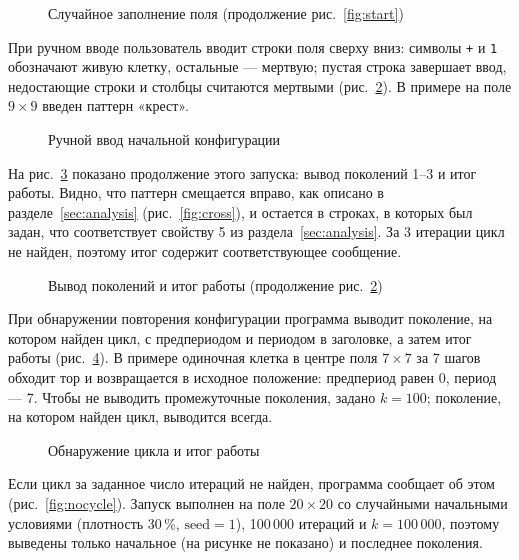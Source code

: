\documentclass[a4paper,14pt]{extarticle}
\newcommand{\consolemedium}{\fontsize{9}{10.5}\selectfont\ttfamily}
\newcommand{\consolesmall}{\fontsize{7}{7.35}\selectfont\ttfamily}
\newcommand{\console}[2][\consolesmall]{}
\begin{document}
\begin{figure}[H]
	\centering
	\console[\consolemedium]{randinit}
	\caption{Случайное заполнение поля (продолжение рис.~\ref{fig:start})}
	\label{fig:randinit}
\end{figure}

При ручном вводе пользователь вводит строки поля сверху вниз: символы \texttt{+} и \texttt{1} обозначают живую клетку, остальные --- мертвую; пустая строка завершает ввод, недостающие строки и столбцы считаются мертвыми (рис.~\ref{fig:manual}). В примере на поле $9 \times 9$ введен паттерн «крест».

\begin{figure}[H]
	\centering
	\console[\consolemedium]{manual}
	\caption{Ручной ввод начальной конфигурации}
	\label{fig:manual}
\end{figure}

На рис.~\ref{fig:run} показано продолжение этого запуска: вывод поколений 1--3 и итог работы. Видно, что паттерн смещается вправо, как описано в разделе~\ref{sec:analysis} (рис.~\ref{fig:cross}), и остается в строках, в которых был задан, что соответствует свойству 5 из раздела~\ref{sec:analysis}. За 3 итерации цикл не найден, поэтому итог содержит соответствующее сообщение.

\begin{figure}[H]
	\centering
	\console[\consolemedium]{run}
	\caption{Вывод поколений и итог работы (продолжение рис.~\ref{fig:manual})}
	\label{fig:run}
\end{figure}

При обнаружении повторения конфигурации программа выводит поколение, на котором найден цикл, с предпериодом и периодом в заголовке, а затем итог работы (рис.~\ref{fig:cycle}). В примере одиночная клетка в центре поля $7 \times 7$ за 7 шагов обходит тор и возвращается в исходное положение: предпериод равен 0, период --- 7. Чтобы не выводить промежуточные поколения, задано $k = 100$; поколение, на котором найден цикл, выводится всегда.

\begin{figure}[H]
	\centering
	\console[\consolemedium]{cycle}
	\caption{Обнаружение цикла и итог работы}
	\label{fig:cycle}
\end{figure}

Если цикл за заданное число итераций не найден, программа сообщает об этом (рис.~\ref{fig:nocycle}). Запуск выполнен на поле $20 \times 20$ со случайными начальными условиями (плотность 30\,\%, $\text{seed} = 1$), 100\,000 итераций и $k = 100\,000$, поэтому выведены только начальное (на рисунке не показано) и последнее поколения.
\end{document}
